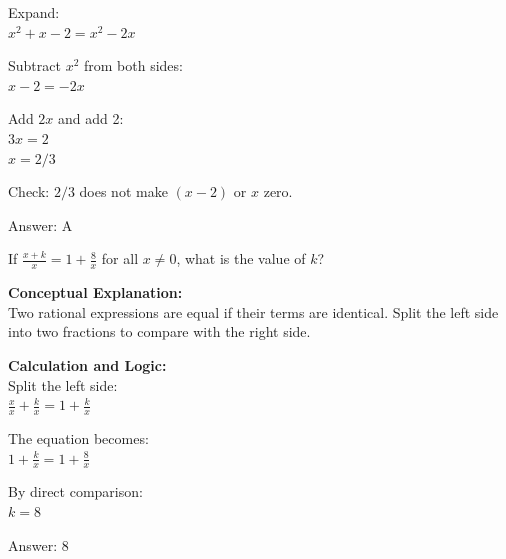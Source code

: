 \documentclass[11pt,paper=a4,answers]{exam}
\begin{document}
\begin{questions}
\begin{solution}
\vspace{10pt}

Expand: \\
$x^2 + x - 2 = x^2 - 2x$

\vspace{10pt}

Subtract $x^2$ from both sides: \\
$x - 2 = -2x$

\vspace{10pt}

Add $2x$ and add 2: \\
$3x = 2$ \\
$x = 2/3$

\vspace{10pt}

Check: $2/3$ does not make $(x-2)$ or $x$ zero.

\vspace{25pt}

Answer: \colorbox{yellow!100}{A}
\end{solution}

\vspace{40pt}

\question
If $\frac{x+k}{x} = 1 + \frac{8}{x}$ for all $x \neq 0$, what is the value of $k$?

\begin{solution}
\textbf{Conceptual Explanation:} \\
Two rational expressions are equal if their terms are identical. Split the left side into two fractions to compare with the right side.

\vspace{20pt}

\textbf{Calculation and Logic:} \\
Split the left side: \\
$\frac{x}{x} + \frac{k}{x} = 1 + \frac{k}{x}$

\vspace{10pt}

The equation becomes: \\
$1 + \frac{k}{x} = 1 + \frac{8}{x}$

\vspace{10pt}

By direct comparison: \\
$k = 8$

\vspace{25pt}

Answer: \colorbox{yellow!100}{8}
\end{solution}


\end{questions}
\end{document}
